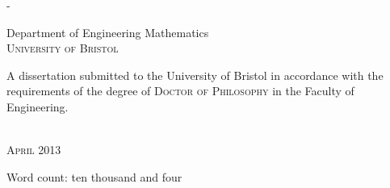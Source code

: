 \begin{titlingpage}
\begin{SingleSpace}
\begin{adjustwidth*}{\unitlength}{-\unitlength}
\begin{center}
   \vspace{6mm}
   {\large Department of Engineering Mathematics\\
   \textsc{University of Bristol}}\\
   \vspace{11mm}
   \begin{minipage}{10cm}
   A dissertation submitted to the University of Bristol in accordance with the requirements of the degree of \textsc{Doctor of Philosophy} in the Faculty of Engineering.
   \end{minipage}\\
   \vspace{9mm}
   {\large\textsc{April 2013}}
   \vspace{12mm}
   \end{center}
   \begin{flushright}
   {\small Word count: ten thousand and four}
   \end{flushright}
   \end{adjustwidth*}
   \end{SingleSpace}
   \end{titlingpage}